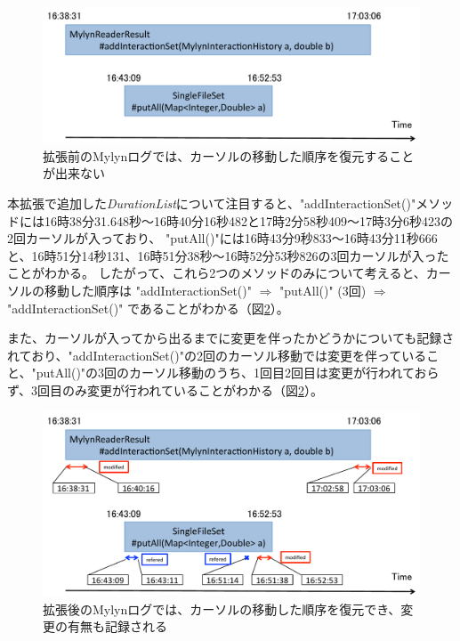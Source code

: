\documentclass[a4paper]{jsbook}
\begin{document}
\begin{figure}[tb]
  \centering
  \includegraphics[width = \linewidth]{resource/only_startdate_enddate.pdf}
  \caption{拡張前のMylynログでは、カーソルの移動した順序を復元することが出来ない}
  \label{only_startdate_enddate}
\end{figure}


本拡張で追加した{\it DurationList}について注目すると、"addInteractionSet()"メソッドには16時38分31.648秒〜16時40分16秒482と17時2分58秒409〜17時3分6秒423の2回カーソルが入っており、
"putAll()"には16時43分9秒833〜16時43分11秒666と、16時51分14秒131、16時51分38秒〜16時52分53秒826の3回カーソルが入ったことがわかる。
したがって、これら2つのメソッドのみについて考えると、カーソルの移動した順序は
"addInteractionSet()" $\Rightarrow$
"putAll()" (3回) $\Rightarrow$
"addInteractionSet()"
であることがわかる（図\ref{with_durationlist}）。

また、カーソルが入ってから出るまでに変更を伴ったかどうかについても記録されており、"addInteractionSet()"の2回のカーソル移動では変更を伴っていること、"putAll()"の3回のカーソル移動のうち、1回目2回目は変更が行われておらず、3回目のみ変更が行われていることがわかる（図\ref{with_durationlist}）。

\begin{figure}[tb]
  \centering
  \includegraphics[width = \linewidth]{resource/with_durationlist.pdf}
  \caption{拡張後のMylynログでは、カーソルの移動した順序を復元でき、変更の有無も記録される}
  \label{with_durationlist}
\end{figure}
\end{document}
